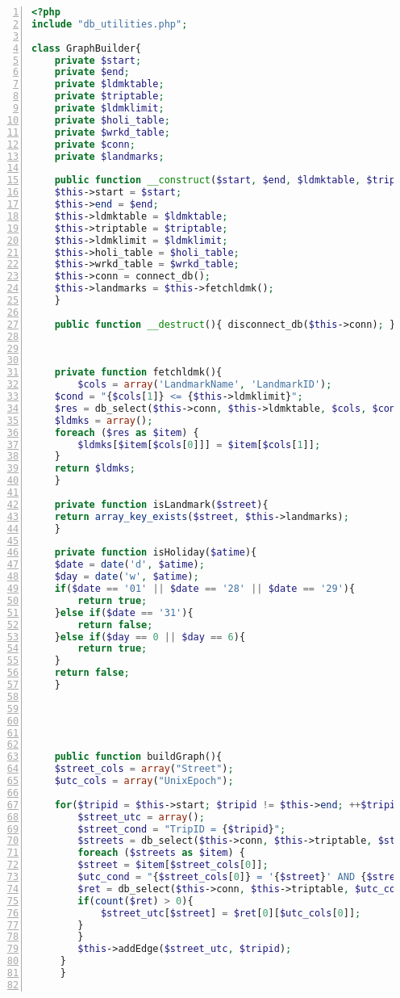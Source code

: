 \begin{lstlisting}[language = PHP, caption = {Landmark Construction}, label = {AList:ldmk_construction}, frame=single, numbers=left, stepnumber=1]
<?php
include "db_utilities.php";

class GraphBuilder{
    private $start;
    private $end;
    private $ldmktable;
    private $triptable;
    private $ldmklimit;
    private $holi_table;
    private $wrkd_table;
    private $conn;
    private $landmarks;

    public function __construct($start, $end, $ldmktable, $triptable, $ldmklimit, $holi_table, $wrkd_table){
	$this->start = $start;
	$this->end = $end;
	$this->ldmktable = $ldmktable;	
	$this->triptable = $triptable;
	$this->ldmklimit = $ldmklimit;
	$this->holi_table = $holi_table;
	$this->wrkd_table = $wrkd_table;
	$this->conn = connect_db();
	$this->landmarks = $this->fetchldmk();
    }

    public function __destruct(){ disconnect_db($this->conn); }



    private function fetchldmk(){
        $cols = array('LandmarkName', 'LandmarkID');
	$cond = "{$cols[1]} <= {$this->ldmklimit}";
	$res = db_select($this->conn, $this->ldmktable, $cols, $cond);
	$ldmks = array();
	foreach ($res as $item) {
	    $ldmks[$item[$cols[0]]] = $item[$cols[1]];
	}
	return $ldmks;
    }

    private function isLandmark($street){
	return array_key_exists($street, $this->landmarks);
    }

    private function isHoliday($atime){
	$date = date('d', $atime);
	$day = date('w', $atime);
	if($date == '01' || $date == '28' || $date == '29'){
	    return true;
	}else if($date == '31'){
	    return false;
	}else if($day == 0 || $day == 6){
	    return true;
	}
	return false;
    }





    public function buildGraph(){
	$street_cols = array("Street");
	$utc_cols = array("UnixEpoch");
		
	for($tripid = $this->start; $tripid != $this->end; ++$tripid){
	    $street_utc = array();
	    $street_cond = "TripID = {$tripid}";
	    $streets = db_select($this->conn, $this->triptable, $street_cols, $street_cond, "DISTINCT");
	    foreach ($streets as $item) {
		$street = $item[$street_cols[0]];
		$utc_cond = "{$street_cols[0]} = '{$street}' AND {$street_cond} LIMIT 1";
		$ret = db_select($this->conn, $this->triptable, $utc_cols, $utc_cond);
		if(count($ret) > 0){
		    $street_utc[$street] = $ret[0][$utc_cols[0]];
		}
	    }
	    $this->addEdge($street_utc, $tripid);
	 }
     }
     

\end{lstlisting}
